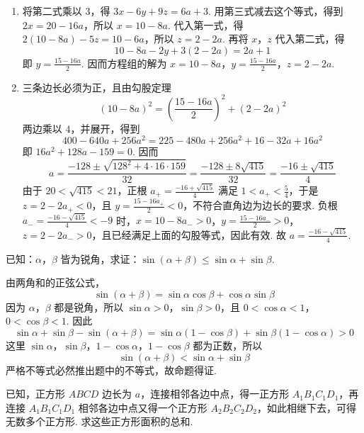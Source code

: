 \begin{solution}
\begin{enumerate}
\item 将第二式乘以 \(3\)，得 \(3x-6y+9z=6a+3\). 用第三式减去这个等式，得到
\(2x=20-16a\)，所以 \(x=10-8a\). 代入第一式，得
\(2\left(10-8a\right)-5z=10-6a\)，所以 \(z=2-2a\). 再将 \(x\)，\(z\) 代入第二式，得
\[
10-8a-2y+3\left(2-2a\right)=2a+1
\]
即 \(y=\frac{15-16a}{2}\). 因而方程组的解为
\(x=10-8a\)，\(y=\frac{15-16a}{2}\)，\(z=2-2a\).

\item 三条边长必须为正，且由勾股定理
\[
(10-8a)^2=\left(\frac{15-16a}{2}\right)^2+(2-2a)^2
\]
两边乘以 \(4\)，并展开，得到
\[
400-640a+256a^2=225-480a+256a^2+16-32a+16a^2
\]
即 \(16a^2+128a-159=0\). 因而
\[
a=\frac{-128\pm\sqrt{128^2+4\cdot16\cdot159}}{32}
=\frac{-128\pm8\sqrt{415}}{32}
=\frac{-16\pm\sqrt{415}}4
\]
由于 \(20<\sqrt{415}<21\)，正根 \(a_+=\frac{-16+\sqrt{415}}4\) 满足 \(1<a_+<\frac54\)，于是 \(z=2-2a_+<0\)，且 \(y=\frac{15-16a_+}{2}<0\)，不符合直角边为边长的要求. 负根 \(a_-=\frac{-16-\sqrt{415}}4<-9\) 时，\(x=10-8a_->0\)，\(y=\frac{15-16a_-}{2}>0\)，\(z=2-2a_->0\)，且已经满足上面的勾股等式，因此有效. 故 \(a=\frac{-16-\sqrt{415}}4\).
\end{enumerate}
\end{solution}

\begin{problem}
已知：\(\alpha\)，\(\beta\) 皆为锐角，求证：\(\sin(\alpha+\beta)\leq\sin\alpha+\sin\beta\).
\end{problem}

\begin{solution}
由两角和的正弦公式，
\[
\sin\left(\alpha+\beta\right)=\sin\alpha\cos\beta+\cos\alpha\sin\beta
\]
因为 \(\alpha\)，\(\beta\) 都是锐角，所以 \(\sin\alpha>0\)，\(\sin\beta>0\)，且 \(0<\cos\alpha<1\)，\(0<\cos\beta<1\). 因此
\[
\sin\alpha+\sin\beta-\sin\left(\alpha+\beta\right)
=\sin\alpha\left(1-\cos\beta\right)+\sin\beta\left(1-\cos\alpha\right)>0
\]
这里 \(\sin\alpha\)，\(\sin\beta\)，\(1-\cos\alpha\)，\(1-\cos\beta\) 都为正数，所以
\[
\sin\left(\alpha+\beta\right)<\sin\alpha+\sin\beta
\]
严格不等式必然推出题中的不等式，故命题得证.
\end{solution}

\begin{problem}
已知，正方形 \(ABCD\) 边长为 \(a\)，连接相邻各边中点，得一正方形 \(A_1B_1C_1D_1\)，再连接 \(A_1B_1C_1D_1\) 相邻各边中点又得一个正方形 \(A_2B_2C_2D_2\)，如此相继下去，可得无数多个正方形. 求这些正方形面积的总和.
\end{problem}

